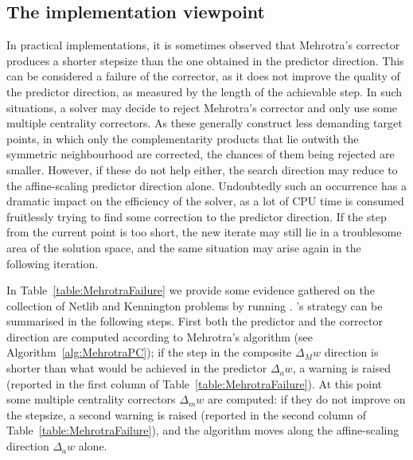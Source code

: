 
%
%
\subsection{The implementation viewpoint}

In practical implementations, it is sometimes observed
that Mehrotra's corrector produces a shorter stepsize 
than the one obtained in the predictor direction. 
This can be considered a failure of the corrector, as it
does not improve the quality of the predictor direction,
as measured by the length of the achievable step.
In such situations, a solver may decide to reject Mehrotra's corrector 
and only use some multiple centrality correctors. 
As these generally construct less demanding target points,
in which only the complementarity products that lie outwith
the symmetric neighbourhood are corrected,
the chances of them being rejected are smaller. 
However, if these do not help either, the search direction may reduce
to the affine-scaling predictor direction alone.
Undoubtedly such an occurrence has a dramatic impact on the 
efficiency of the solver, as a lot of CPU time is consumed
fruitlessly trying to find some correction to the predictor
direction.
If the step from the current point is too short, the new iterate may
still lie in a troublesome area of the solution space, and the
same situation may arise again in the following iteration.

In Table~\ref{table:MehrotraFailure} we provide some evidence
gathered on the collection of Netlib and Kennington problems
by running  \cite{HOPDM}.
\HOPDM's strategy can be summarised in the following steps.
First both the predictor and the corrector direction are
computed according to Mehrotra's algorithm 
(see Algorithm~\ref{alg:MehrotraPC}); if the step in the 
composite $\Delta_M w$ direction is shorter than what would be
achieved in the predictor $\Delta_a w$, a warning is raised
(reported in the first column of Table~\ref{table:MehrotraFailure}).
At this point some multiple centrality correctors $\Delta_m w$ are computed:
if they do not improve on the stepsize, a second warning is raised
(reported in the second column of Table~\ref{table:MehrotraFailure}),
and the algorithm moves along the affine-scaling direction $\Delta_a w$
alone.

